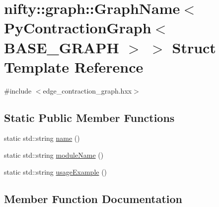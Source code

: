 \hypertarget{structnifty_1_1graph_1_1GraphName_3_01PyContractionGraph_3_01BASE__GRAPH_01_4_01_4}{}\section{nifty\+:\+:graph\+:\+:Graph\+Name$<$ Py\+Contraction\+Graph$<$ B\+A\+S\+E\+\_\+\+G\+R\+A\+PH $>$ $>$ Struct Template Reference}
\label{structnifty_1_1graph_1_1GraphName_3_01PyContractionGraph_3_01BASE__GRAPH_01_4_01_4}


{\ttfamily \#include $<$edge\+\_\+contraction\+\_\+graph.\+hxx$>$}

\subsection*{Static Public Member Functions}
\begin{DoxyCompactItemize}
\item 
static std\+::string \hyperlink{structnifty_1_1graph_1_1GraphName_3_01PyContractionGraph_3_01BASE__GRAPH_01_4_01_4_aeaaa5d12ae9dbe2ad7e1f69605fe9f84}{name} ()
\item 
static std\+::string \hyperlink{structnifty_1_1graph_1_1GraphName_3_01PyContractionGraph_3_01BASE__GRAPH_01_4_01_4_a318c414146fa3a5869e920842b511e3b}{module\+Name} ()
\item 
static std\+::string \hyperlink{structnifty_1_1graph_1_1GraphName_3_01PyContractionGraph_3_01BASE__GRAPH_01_4_01_4_ac8db233096e47d4733bc569a8634eed6}{usage\+Example} ()
\end{DoxyCompactItemize}


\subsection{Member Function Documentation}
\mbox{\label{structnifty_1_1graph_1_1GraphName_3_01PyContractionGraph_3_01BASE__GRAPH_01_4_01_4_a318c414146fa3a5869e920842b511e3b}} 
